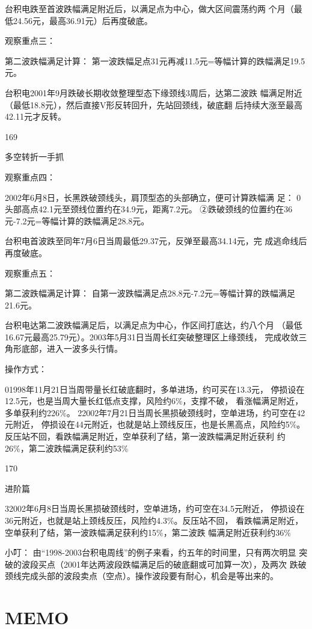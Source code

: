\documentclass{article}
\begin{document}
台积电跌至首波跌幅满足附近后，以满足点为中心，做大区间震荡约两 个月（最低24.56元，最高36.91元）后再度破底。

观察重点三：

第二波跌幅满足计算： 第一波跌幅足点31元再减11.5元=等幅计算的跌幅满足19.5元。

台积电2001年9月跌破长期收敛整理型态下缘颈线3周后，达第二波跌 幅满足附近（最低18.8元），然后直接V形反转回升，先站回颈线，破底翻 后持续大涨至最高42.11元才反转。

169

\clearpage

多空转折一手抓

观察重点四：

2002年6月8日，长黑跌破颈线头，肩顶型态的头部确立，便可计算跌幅满 足： 0头部高点42.1元至颈线位置约在34.9元，距离7.2元。 ②跌破颈线的位置约在36元-7.2元=等幅计算的跌幅满足28.8元。

台积电首波跌至同年7月6日当周最低29.37元，反弹至最高34.14元，完 成逃命线后再度破底。

观察重点五：

第二波跌幅满足计算： 自第一波跌幅满足点28.8元-7.2元=等幅计算的跌幅满足21.6元。

台积电达第二波跌幅满足后，以满足点为中心，作区间打底达，约八个月 （最低16.67元最高25.79元）。2003年5月31日当周长红突破整理区上缘颈线， 完成收敛三角形底部，进入一波多头行情。

操作方式：

01998年11月21日当周带量长红破底翻时，多单进场，约可买在13.3元， 停损设在12.5元，也是当周大量长红低点支撑，风险约6\%，支撑不破， 看涨幅满足附近，多单获利约226\%。 22002年7月21日当周长黑损破颈线时，空单进场，约可空在42元附近， 停损设在44元附近，也就是站上颈线反压，也是长黑高点，风险约5\%。 反压站不回，看跌幅满足附近，空单获利了结，第一波跌幅满足附近获利 约26\%，第二波跌幅满足获利约53\%

170

\clearpage

进阶篇

32002年6月8日当周长黑损破颈线时，空单进场，约可空在34.5元附近， 停损设在36元附近，也就是站上颈线反压，风险约4.3\%。反压站不回， 看跌幅满足附近，空单获利了结，第一波跌幅满足获利约15\%，第二波跌 幅满足附近获利约36\%

小叮： 由“1998-2003台积电周线”的例子来看，约五年的时间里，只有两次明显 突破的波段买点（2001年达两波段跌幅满足后的破底翻或可加算一次），及两次 跌破颈线完成头部的波段卖点（空点）。操作波段要有耐心，机会是等出来的。

\section{MEMO}
\end{document}
